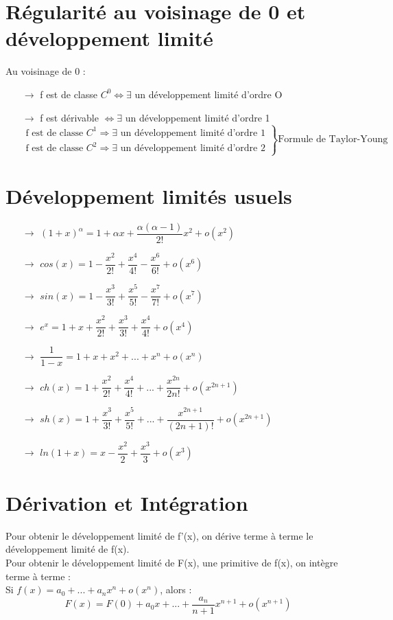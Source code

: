 \section{Régularité au voisinage de 0 et développement limité}
\begin{de}
Au voisinage de 0 :
\begin{itemize}
 \item[$\rightarrow$] f est de classe $C^0 \Leftrightarrow \exists$ un développement limité d'ordre O
 \item[$\rightarrow$] f est dérivable $\Leftrightarrow \exists$ un développement limité d'ordre 1
  \[\left.\begin{array}{l}
 \mbox{f est de classe } C^1 \Rightarrow \exists \mbox{ un développement limité d'ordre 1}\\
 \mbox{f est de classe } C^2 \Rightarrow \exists \mbox{ un développement limité d'ordre 2}
  \end{array}\right\}
\mbox{Formule de Taylor-Young}\]
\end{itemize}
\end{de}
\section{Développement limités usuels}
\begin{itemize}
 \item[$\rightarrow$]$(1+x)^{\alpha} = 1 + \alpha x+\dfrac{\alpha (\alpha - 1)}{2!}x^2+o(x^2)$
 \item[$\rightarrow$]$cos(x) = 1 - \dfrac{x^2}{2!}+\dfrac{x^4}{4!}-\dfrac{x^6}{6!}+o(x^6)$
 \item[$\rightarrow$]$sin(x) = 1 - \dfrac{x^3}{3!}+\dfrac{x^5}{5!}-\dfrac{x^7}{7!}+o(x^7)$
 \item[$\rightarrow$]$e^x = 1 +x + \dfrac{x^2}{2!}+\dfrac{x^3}{3!}+\dfrac{x^4}{4!}+o(x^4)$
 \item[$\rightarrow$]$\dfrac{1}{1-x} = 1+x+x^2+...+x^n+o(x^n)$
 \item[$\rightarrow$]$ch(x) = 1 + \dfrac{x^2}{2!}+\dfrac{x^4}{4!}+...+\dfrac{x^{2n}}{2n!}+o(x^{2n+1})$
 \item[$\rightarrow$]$sh(x) = 1 + \dfrac{x^3}{3!}+\dfrac{x^5}{5!}+...+\dfrac{x^{2n+1}}{(2n+1)!}+o(x^{2n+1})$
 \item[$\rightarrow$] $ln(1+x) = x - \dfrac{x^2}{2} + \dfrac{x^3}{3} +o(x^3)$
\end{itemize}
\section{Dérivation et Intégration}
\begin{de}
Pour obtenir le développement limité de f'(x), on dérive terme à terme le développement limité de f(x). \\
Pour obtenir le développement limité de F(x), une primitive de f(x), on intègre terme à terme :\\
Si $f(x)=a_0+...+a_nx^n+o(x^n)$, alors :
$$F(x)=F(0)+a_0x+...+\dfrac{a_n}{n+1}x^{n+1}+o(x^{n+1})$$
\end{de}

